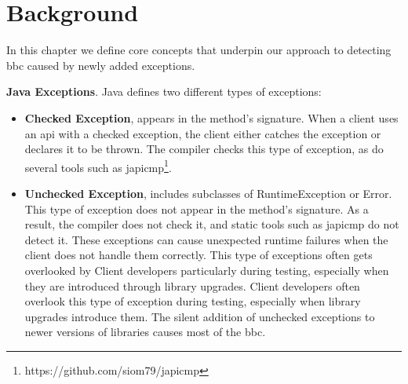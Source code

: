 \chapter{Background}

In this chapter we define core concepts that underpin our approach to detecting \gls{bbc} caused by newly added exceptions.

\textbf{Java Exceptions}. Java defines two different types of exceptions: 
\begin{itemize}
    \item \textbf{Checked Exception}, appears in the method's signature. When a client uses an \gls{api} with a checked exception, the client either catches the exception or declares it to be thrown. The compiler checks this type of exception, as do several tools such as japicmp\footnote{https://github.com/siom79/japicmp}. 
    \item \textbf{Unchecked Exception}, includes subclasses of RuntimeException or Error. This type of exception does not appear in the method's signature. As a result, the compiler does not check it, and static tools such as japicmp do not detect it. These exceptions can cause unexpected runtime failures when the client does not handle them correctly. This type of exceptions often gets overlooked by Client developers particularly during testing, especially when they are introduced through library upgrades. Client developers often overlook this type of exception during testing, especially when library upgrades introduce them. The silent addition of unchecked exceptions to newer versions of libraries causes most of the \gls{bbc}.
\end{itemize}

